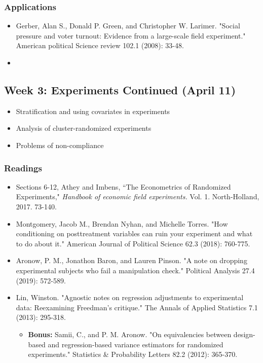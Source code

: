 \documentclass[11pt, article, oneside]{memoir}
\theoremstyle{Assumption}
\begin{document}
\subsubsection*{Applications}

\begin{itemize}
\item Gerber, Alan S., Donald P. Green, and Christopher W. Larimer. "Social pressure and voter turnout: Evidence from a large-scale field experiment." American political Science review 102.1 (2008): 33-48.
\item 
\end{itemize}

\subsection{Week 3: Experiments Continued (April 11)}

\begin{itemize}
\item Stratification and using covariates in experiments
\item Analysis of cluster-randomized experiments
\item Problems of non-compliance
\end{itemize}

\subsubsection*{Readings}

\begin{itemize}
\item Sections 6-12, Athey and Imbens, ``The Econometrics of Randomized Experiments,"  \textit{Handbook of economic field experiments.} Vol. 1. North-Holland, 2017. 73-140. 
\item Montgomery, Jacob M., Brendan Nyhan, and Michelle Torres. "How conditioning on posttreatment variables can ruin your experiment and what to do about it." American Journal of Political Science 62.3 (2018): 760-775.
\item Aronow, P. M., Jonathon Baron, and Lauren Pinson. "A note on dropping experimental subjects who fail a manipulation check." Political Analysis 27.4 (2019): 572-589.
\item Lin, Winston. "Agnostic notes on regression adjustments to experimental data: Reexamining Freedman’s critique." The Annals of Applied Statistics 7.1 (2013): 295-318.
\begin{itemize}
\item \textbf{Bonus:} Samii, C., and P. M. Aronow. "On equivalencies between design-based and regression-based variance estimators for randomized experiments." Statistics \& Probability Letters 82.2 (2012): 365-370.
\end{itemize}

\end{itemize}
\end{document}
